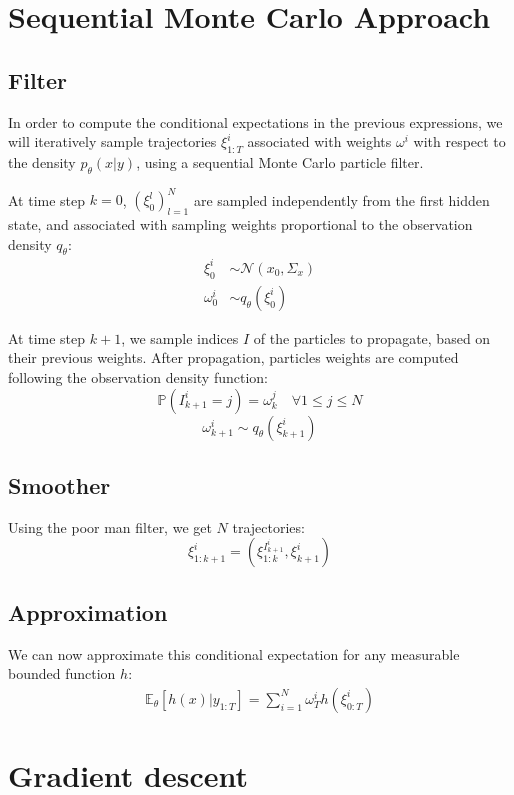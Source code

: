 \documentclass[10pt,a4paper]{report}
\begin{document}
\section{Sequential Monte Carlo Approach}
\label{sec:smc}

\subsection{Filter}
In order to compute the conditional expectations in the previous expressions, we will iteratively sample trajectories $\xi_{1:T}^i$ associated with weights $\omega^i$ with respect to the density $p_\theta(x | y)$, using a sequential Monte Carlo particle filter.

At time step $k=0$, $(\xi_0^l)_{l=1}^N$ are sampled independently from the first hidden state, and associated with sampling weights proportional to the observation density $q_\theta$:
\begin{align*}
        \xi_0^i    & \sim \mathcal{N}(x_0, \Sigma_x) \\
        \omega_0^i & \sim q_\theta(\xi_0^i)
\end{align*}

At time step $k+1$, we sample indices $I$ of the particles to propagate, based on their previous weights.
After propagation, particles weights are computed following the observation density function:
$$\mathbb{P}(I_{k+1}^i=j) = \omega_k^j \quad \forall 1 \leq j \leq N$$
$$\omega_{k+1}^i \sim q_\theta(\xi_{k+1}^i)$$

\subsection{Smoother}
Using the poor man filter, we get $N$ trajectories:
$$\xi_{1:k+1}^{i} = (\xi_{1:k}^{I_{k+1}^i}, \xi_{k+1}^i)$$

\subsection{Approximation}
We can now approximate this conditional expectation for any measurable bounded function $h$:
\begin{align*}
        \mathbb{E}_\theta \left[ h(x) | y_{1:T} \right] = \sum_{i=1}^N \omega_T^i h(\xi_{0:T}^i)
\end{align*}

\section{Gradient descent}
\label{sec:gradient_descent}
\end{document}
